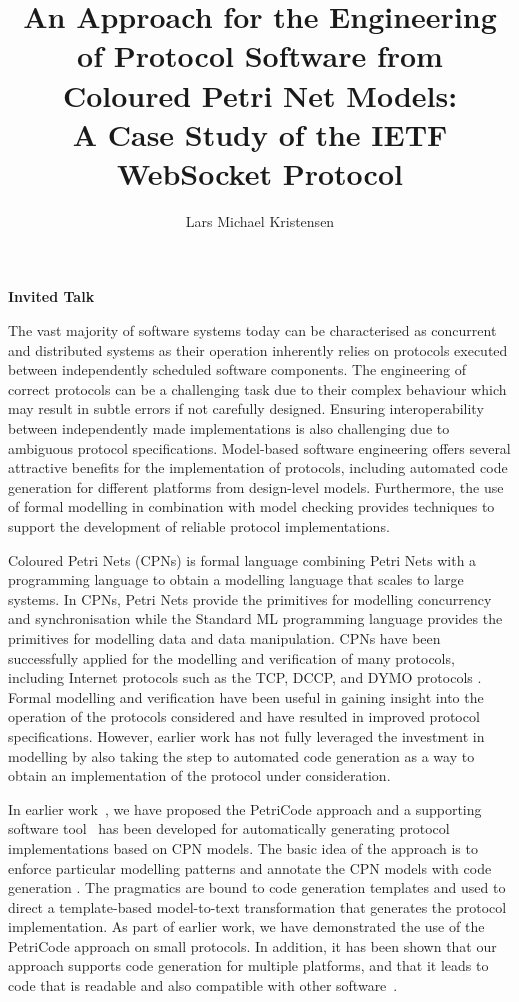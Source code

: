 \documentclass[a4paper]{llncs}
\title{An Approach for the Engineering of Protocol Software from Coloured Petri Net Models: \\ A Case Study of the IETF WebSocket Protocol}
\author{Lars Michael Kristensen}
\institute{Department of Computing, Bergen University College, Norway
\\
Email: \email{lmkr@hib.no} 
}
\begin{document}
  
\maketitle

\begin{center}
{\textbf{Invited Talk}}
\end{center}

The vast majority of software systems today can be characterised as
concurrent and distributed systems as their operation inherently
relies on protocols executed between independently scheduled software
components. The engineering of correct protocols can
be a challenging task due to their complex behaviour which may result
in subtle errors if not carefully designed. Ensuring
interoperability between independently made implementations is also
challenging due to ambiguous protocol specifications.  Model-based
software engineering offers several attractive benefits for the
implementation of protocols, including automated code generation for
different platforms from design-level models. Furthermore, the use of
formal modelling in combination with model checking
provides techniques to support the development of reliable protocol
implementations.

Coloured Petri Nets (CPNs) \cite{CPNTOOLSPAPER} is formal language
combining Petri Nets with a programming language to obtain a modelling
language that scales to large systems. In CPNs, Petri Nets provide the
primitives for modelling concurrency and synchronisation while the
Standard ML programming language provides the primitives for modelling
data and data manipulation. CPNs have been successfully applied for
the modelling and verification of many protocols, including Internet
protocols such as the TCP, DCCP, and DYMO protocols
\cite{billington04,acpn2012}. Formal modelling and verification have
been useful in gaining insight into the operation of the protocols
considered and have resulted in improved protocol
specifications. However, earlier work has not fully leveraged the
investment in modelling by also taking the step to automated code
generation as a way to obtain an implementation of the protocol under
consideration.


In earlier work~\cite{SKK13-2}, we have proposed the PetriCode
approach and a supporting software tool~\cite{petricodePaper} has been
developed for automatically generating protocol implementations based
on CPN models.  The basic idea of the approach is to enforce
particular modelling patterns and annotate the CPN models with code
generation . The pragmatics are bound to code
generation templates and used to direct a template-based model-to-text
transformation that generates the protocol implementation. As part of
earlier work, we have demonstrated the use of the PetriCode approach
on small protocols. In addition, it has been shown that our approach
supports code generation for multiple platforms, and that it leads to
code that is readable and also compatible with other
software~\cite{ecmfa14}.
\end{document}
